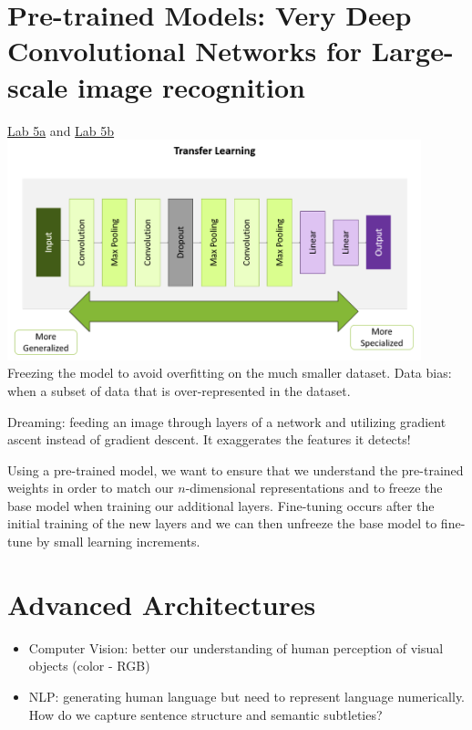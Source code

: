 \documentclass{article}
\begin{document}
\section{Pre-trained Models: Very Deep Convolutional Networks for Large-scale image recognition}
\href{http://dli-e5d62e622240-a8611b.westus3.cloudapp.azure.com/lab/lab/tree/05a_doggy_door.ipynb}{Lab 5a} and \href{http://dli-e5d62e622240-a8611b.westus3.cloudapp.azure.com/lab/lab/tree/05b_presidential_doggy_door.ipynb}{Lab 5b}\\
\includegraphics[width=0.9\textwidth]{../images/transferLearnign.png}\\
Freezing the model to avoid overfitting on the much smaller dataset. Data bias: when a subset of data that is over-represented in the dataset. 

Dreaming: feeding an image through layers of a network and utilizing gradient ascent instead of gradient descent. It exaggerates the features it detects! 

Using a pre-trained model, we want to ensure that we understand the pre-trained weights in order to match our $n$-dimensional representations and to freeze the base model when training our additional layers. Fine-tuning occurs after the initial training of the new layers and we can then unfreeze the base model to fine-tune by small learning increments. 

\section{Advanced Architectures}
\begin{itemize}
    \item Computer Vision: better our understanding of human perception of visual objects (color - RGB)
    \item NLP: generating human language but need to represent language numerically. How do we capture sentence structure and semantic subtleties? 
\end{itemize}
\end{document}
